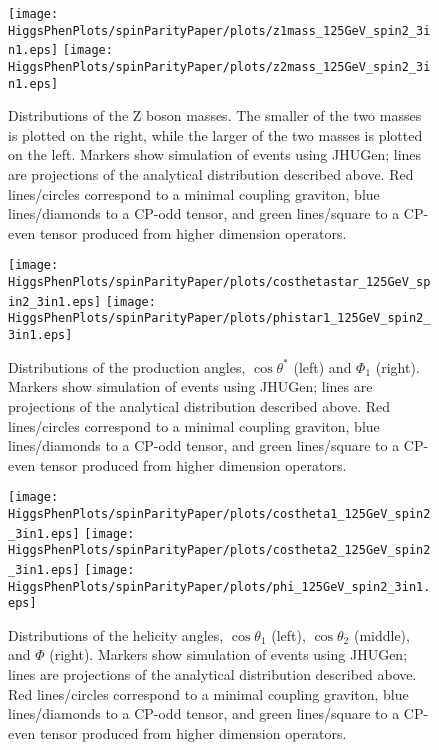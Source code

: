 \begin{figure}
\begin{center}
\texttt{[image: HiggsPhenPlots/spinParityPaper/plots/z1mass\_125GeV\_spin2\_3in1.eps]}
\texttt{[image: HiggsPhenPlots/spinParityPaper/plots/z2mass\_125GeV\_spin2\_3in1.eps]}
\caption{Distributions of the Z boson masses.  The smaller of the two masses is
plotted on the right, while the larger of the two masses is plotted on the
left. Markers show simulation of events using JHUGen; lines are projections
of the analytical distribution described above.  Red lines/circles correspond
to a minimal coupling graviton, blue lines/diamonds to a CP-odd tensor, 
and green lines/square to
a CP-even tensor produced from higher dimension operators.}
\label{fig:TensorMasses}
\end{center}
\end{figure}

\begin{figure}
\begin{center}
\texttt{[image: HiggsPhenPlots/spinParityPaper/plots/costhetastar\_125GeV\_spin2\_3in1.eps]}
\texttt{[image: HiggsPhenPlots/spinParityPaper/plots/phistar1\_125GeV\_spin2\_3in1.eps]}
\caption{Distributions of the production angles, $\cos\theta^*$ (left) and
$\Phi_1$ (right). Markers show simulation of events using JHUGen; lines
are projections
of the analytical distribution described above.  Red lines/circles correspond
to a minimal coupling graviton, blue lines/diamonds to a CP-odd tensor, 
and green lines/square to a CP-even tensor produced from higher dimension operators.}
\label{fig:TensorProdAngles}
\end{center}
\end{figure}

\begin{figure}
\begin{center}
\texttt{[image: HiggsPhenPlots/spinParityPaper/plots/costheta1\_125GeV\_spin2\_3in1.eps]}
\texttt{[image: HiggsPhenPlots/spinParityPaper/plots/costheta2\_125GeV\_spin2\_3in1.eps]}
\texttt{[image: HiggsPhenPlots/spinParityPaper/plots/phi\_125GeV\_spin2\_3in1.eps]}
\caption{Distributions of the helicity angles, $\cos\theta_1$ (left), 
$\cos\theta_2$ (middle), and $\Phi$ (right). Markers show simulation of 
events using JHUGen; lines are projections
of the analytical distribution described above.  Red lines/circles correspond
to a minimal coupling graviton, blue lines/diamonds to a CP-odd tensor, 
and green lines/square to a CP-even tensor produced from higher dimension operators.}
\label{fig:TensorHelicityAngles}
\end{center}
\end{figure}

